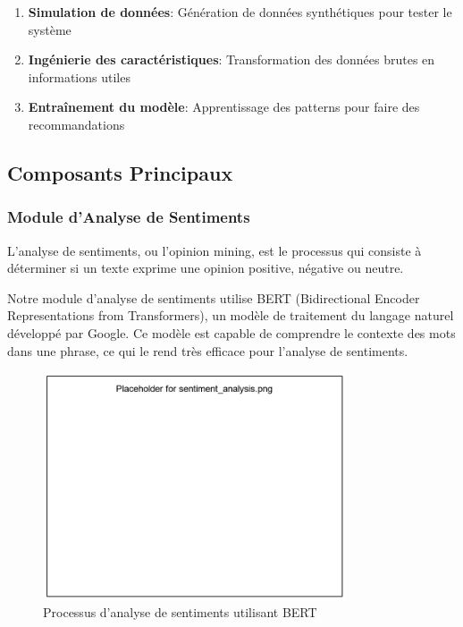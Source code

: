 \documentclass[12pt,a4paper]{article}
\begin{document}
\begin{enumerate}
    \item \textbf{Simulation de données}: Génération de données synthétiques pour tester le système
    \item \textbf{Ingénierie des caractéristiques}: Transformation des données brutes en informations utiles
    \item \textbf{Entraînement du modèle}: Apprentissage des patterns pour faire des recommandations
\end{enumerate}

\subsection{Composants Principaux}

\subsubsection{Module d'Analyse de Sentiments}

\begin{definitionbox}[title=Analyse de Sentiments]
L'analyse de sentiments, ou l'opinion mining, est le processus qui consiste à déterminer si un texte exprime une opinion positive, négative ou neutre.
\end{definitionbox}

Notre module d'analyse de sentiments utilise BERT (Bidirectional Encoder Representations from Transformers), un modèle de traitement du langage naturel développé par Google. Ce modèle est capable de comprendre le contexte des mots dans une phrase, ce qui le rend très efficace pour l'analyse de sentiments.

\begin{figure}[H]
    \centering
    \includegraphics[width=0.8\textwidth]{images/sentiment_analysis.png}
    \caption{Processus d'analyse de sentiments utilisant BERT}
    \label{fig:sentiment}
\end{figure}
\end{document}

